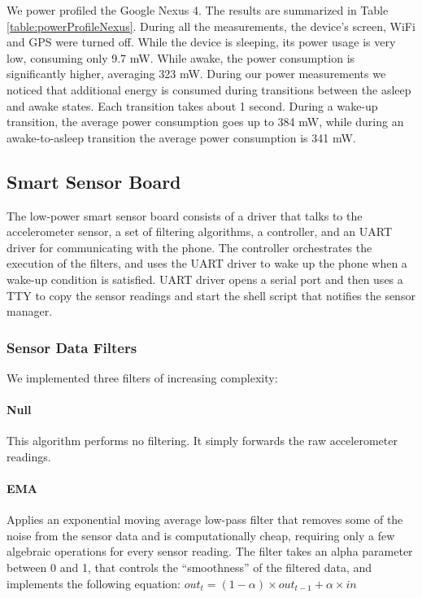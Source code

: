 We power profiled the Google Nexus 4. The results are summarized in
Table \ref{table:powerProfileNexus}. During all the measurements, the
device's screen, WiFi and GPS were turned off.  While the device is
sleeping, its power usage is very low, consuming only 9.7 mW. While
awake, the power consumption is significantly higher, averaging 323
mW. During our power measurements we noticed that additional energy is
consumed during transitions between the asleep and awake states. Each
transition takes about 1 second. During a wake-up transition, the
average power consumption goes up to 384 mW, while during an
awake-to-asleep transition the average power consumption is 341 mW.


\subsection{Smart Sensor Board}
\label{subsec:sensorBoard}

The low-power smart sensor board consists of a driver that talks to
the accelerometer sensor, a set of filtering algorithms, a controller,
and an UART driver for communicating with the phone. The controller
orchestrates the execution of the filters, and uses the UART driver to
wake up the phone when a wake-up condition is satisfied.  UART driver
opens a serial port and then uses a TTY to copy the sensor readings
and start the shell script that notifies the sensor manager.


\subsubsection{Sensor Data Filters}
\label{sec:sensorDataFilters}

We implemented three filters of increasing complexity:

\paragraph{Null} This algorithm performs no filtering.  It simply
  forwards the raw accelerometer readings.


  \paragraph{EMA} Applies an exponential moving average low-pass
  filter that removes some of the noise from the sensor data and is
  computationally cheap, requiring only a few algebraic operations for
  every sensor reading. The filter takes an alpha parameter between 0
  and 1, that controls the ``smoothness'' of the filtered data, and
  implements the following equation: $out_{t} = (1-\alpha) \times
  out_{t-1} + \alpha \times in$

